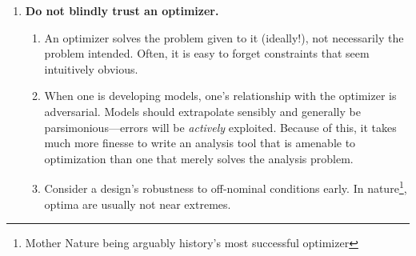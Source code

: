 \begin{enumerate}
\begin{enumerate}
        \item Analysis results used in MDO should be an \emph{unbiased} estimator of the author's belief state about some quantity. This is often \emph{not} the raw output of a first-principles physics model, since these often bias optimistic due to assumptions\footnote{As aerospace examples: a) a RANS CFD study on defeatured geometry that ignores flap track fairings, skin gaps, or protuberances; b) an XFoil analysis that assumes laminar flow is still achievable beyond a line of leading-edge rivets; or c) a wing weight build-up that neglects \emph{expected} weight growth during detailed design. These \emph{expected} biases should be corrected before inclusion in a design tool, and these corrections \emph{do not count as margin}.}. A good rough litmus test for biased outputs is to consider whether one would be more surprised to learn that the model was erring high versus low—these should ideally carry roughly equal surprise.
        \item Account for margin explicitly, and usually only in top-level closure loops and parameters (weight, drag, power, load factor, etc.). Remember that margin is performance beyond the \emph{limit} case, not the \emph{baseline} case\footnote{For example, in aircraft design, thrust margin is the excess beyond what is needed for \emph{climb} (possibly with one engine inoperative), not \emph{cruise}. If performance is \emph{ever} intended to be used during nominal limit-case operation of the system, this cannot be counted as margin.}. Also, corrections for suspected bias do not count as margin: margin is for mitigating unknown unknowns, not known unknowns.
    \end{enumerate}
    \item \textbf{Do not blindly trust an optimizer.}
    \begin{enumerate}
        \item An optimizer solves the problem given to it (ideally!), not necessarily the problem intended. Often, it is easy to forget constraints that seem intuitively obvious.
        \item When one is developing models, one's relationship with the optimizer is adversarial. Models should extrapolate sensibly and generally be parsimonious—errors will be \emph{actively} exploited. Because of this, it takes much more finesse to write an analysis tool that is amenable to optimization than one that merely solves the analysis problem.
        \item Consider a design's robustness to off-nominal conditions early. In nature\footnote{Mother Nature being arguably history's most successful optimizer}, optima are usually not near extremes.

\end{enumerate}
\end{enumerate}
